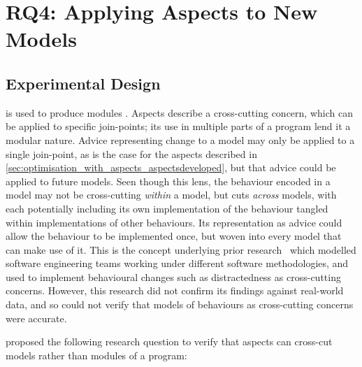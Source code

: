 \section{RQ4: Applying Aspects to New Models}
\label{sec:rq4}


\subsection{Experimental Design}


\Aop{} is used to produce modules . Aspects describe a cross-cutting concern,
which can be applied to specific join-points; its use in multiple parts of a
program lend it a modular nature. Advice representing change to a model may only
be applied to a single join-point, as is the case for the aspects described in
\cref{sec:optimisation_with_aspects_aspectsdeveloped}, but that advice could be
applied to future models. Seen though this lens, the behaviour encoded in a
model may not be cross-cutting \emph{within} a model, but cuts \emph{across}
models, with each potentially including its own implementation of the behaviour
tangled within implementations of other behaviours. Its representation as advice
could allow the behaviour to be implemented once, but woven into every model
that can make use of it. This is the concept underlying prior
research~\cite{wallis2018caise} which modelled software engineering teams
working under different software methodologies, and used \aop{} to implement
behavioural changes such as distractedness as cross-cutting concerns. However,
this research did not confirm its findings against real-world data, and so could
not verify that models of behaviours as cross-cutting concerns were accurate.

 proposed the following research question to verify that
aspects can cross-cut models rather than modules of a program:

\begin{researchquestion}
  \rqfour{}
\end{researchquestion}

